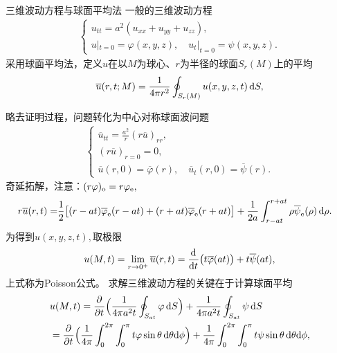 \begin{example}{三维波动方程与球面平均法}{}
	一般的三维波动方程
	\begin{align*}
		\begin{cases}
			u_{tt} = a^2(u_{xx} + u_{yy} + u_{zz}),                     \\
			u|_{t=0} = \varphi(x,y,z),\quad u_t|_{t=0} = \psi(x,y,z).
		\end{cases}
	\end{align*}
	采用球面平均法，定义$u$在以$M$为球心、$r$为半径的球面$S_r(M)$上的平均
	\begin{equation}
		\label{eq:mmp-spherical-mean}
		\overline u(r,t;M) = \frac1{4\pi r^2}\oint_{S_r(M)}u(x,y,z,t)\mathop{}\!\mathrm{d} S,
	\end{equation}
	
	略去证明过程，问题转化为中心对称球面波问题
	\begin{align*}
		\begin{cases}
			\overline u_{tt} = \frac{a^2}r(r\overline u)_{rr},                                \\
			(r\overline u)_{r=0} = 0,                                                        \\
			\overline u(r,0) = \overline\varphi(r),\quad\overline u_t(r,0) = \overline\psi(r).
		\end{cases}
	\end{align*}
	奇延拓解，注意：$(r\varphi)_\mathrm o = r\varphi_\mathrm e,$
	\begin{align*}
		r\overline u(r,t) = & \frac12\bigl[(r - at)\overline\varphi_\mathrm e(r - at) + (r + at)\overline\varphi_\mathrm e(r + at)\bigr] + \frac1{2a}\int_{r-at}^{r+at}\rho\overline\psi_\mathrm e(\rho)\mathop{}\!\mathrm{d}\rho.
	\end{align*}
	为得到$u(x,y,z,t),$取极限
	\begin{equation}
		\label{eq:mmp-kirchhoff-mean-formula}
		u(M,t) = \lim_{r\to 0^+}\overline u(r,t)
		= \frac{\mathop{}\!\mathrm{d}^{}}{\mathrm{d}{t}^{}}\bigl(t\overline\varphi(at)\bigr) + t\overline\psi(at),
	\end{equation}
	上式称为Poisson公式。
	\tcblower
	求解三维波动方程的关键在于计算球面平均
	\begin{align}
		\label{3D-Wave}
		&u(M,t) = \frac{\partial^{}}{\partial{t}^{}}\Bigl(\frac1{4\pi a^2t}\oint_{S_{at}}\varphi\mathop{}\!\mathrm{d} S\Bigr) + \frac1{4\pi a^2t}\oint_{S_{at}}\psi\mathop{}\!\mathrm{d} S\\\notag
		& = \frac{\partial^{}}{\partial{t}^{}}\Bigl(\frac1{4\pi}\int_0^{2\pi}\int_0^\pi t\varphi\sin\theta\mathop{}\!\mathrm{d}\theta\mathrm{d}\phi\Bigr) + \frac1{4\pi}\int_0^{2\pi}\int_0^\pi t\psi\sin\theta\mathop{}\!\mathrm{d}\theta\mathrm{d}\phi,
	\end{align}
\end{example}

